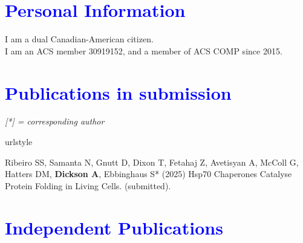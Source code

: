 \documentclass[margin,line]{res}
\begin{document}
\begin{resume}
\section{\sc \textcolor{blue}{ Personal Information}}
I am a dual Canadian-American citizen.\\
I am an ACS member 30919152, and a member of ACS COMP since 2015.

\newpage
\section{\sc \textcolor{blue}{Publications in submission}}


\emph{[*] = corresponding author}
\vspace {0.05in}

\begingroup
\begin{spacing}{1.2}
\renewcommand{\section}[2]{}%
\begin{thebibliography}{10}
\providecommand{\url}[1]{\texttt{#1}}
\providecommand{\urlprefix}{URL }
\expandafter\ifx\csname urlstyle\endcsname\relax
  \providecommand{\doi}[1]{doi:\discretionary{}{}{}#1}\else
  \providecommand{\doi}{doi:\discretionary{}{}{}\begingroup
  \urlstyle{rm}\Url}\fi
\providecommand{\bibAnnoteFile}[1]{%
  \IfFileExists{#1}{\begin{quotation}\noindent\textsc{Key:} #1\\
  \textsc{Annotation:}\ \end{quotation}}{}}
\providecommand{\bibAnnote}[2]{%
  \begin{quotation}\noindent\textsc{Key:} #1\\
  \textsc{Annotation:}\ #2\end{quotation}}
\providecommand{\eprint}[2][]{\url{#2}}

\setlength{\itemsep}{0.15in}

  Ribeiro SS, Samanta N, Gnutt D, Dixon T, Fetahaj Z, Avetisyan A, McColl G, Hatters DM, {\bf Dickson A}, Ebbinghaus S* (2025) Hsp70 Chaperones Catalyse Protein Folding in Living Cells.
  \newblock (submitted).
  
\end{thebibliography}
\end{spacing}
\endgroup

\section{\sc \textcolor{blue}{Independent Publications}}


\end{resume}
\end{document}
